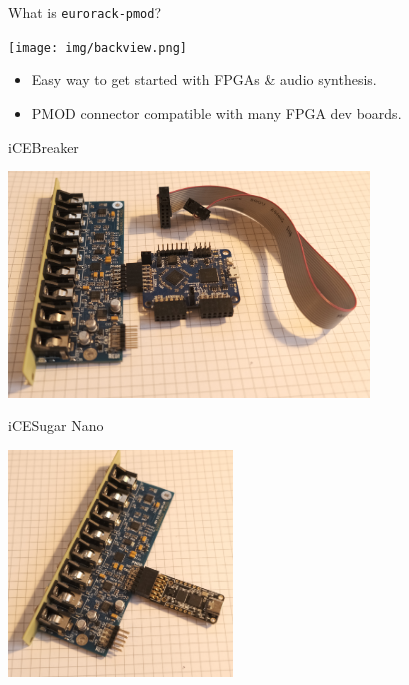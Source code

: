 \documentclass[aspectratio=169]{beamer}
\begin{document}

\begin{frame}{What is \texttt{eurorack-pmod}?}

    \begin{center}
        \texttt{[image: img/backview.png]}
    \end{center}

    \begin{itemize}
        \item Easy way to get started with FPGAs \& audio synthesis.
        \item PMOD connector compatible with many FPGA dev boards.
    \end{itemize}

\end{frame}

\begin{frame}{iCEBreaker}

\begin{center}
    \includegraphics[height=6cm]{img/icebreaker.png}
\end{center}

\end{frame}

\begin{frame}{iCESugar Nano}

\begin{center}
    \includegraphics[height=6cm]{img/icesugar_nano.png}
\end{center}

\end{frame}
\end{document}
